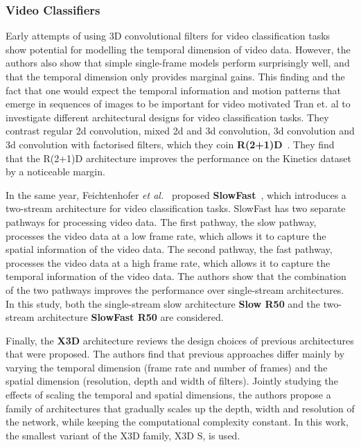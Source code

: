 \documentclass[a4paper]{article}
\begin{document}
\subsubsection{Video Classifiers} %

Early attempts of using 3D convolutional filters for video classification
tasks~\cite{i3d, c3d} show potential for modelling the temporal dimension of
video data. However, the authors also show that simple single-frame models
perform surprisingly well, and that the temporal dimension only provides
marginal gains. This finding and the fact that one would expect the temporal
information and motion patterns that emerge in sequences of images to be
important for video motivated Tran et. al to investigate different architectural
designs for video classification tasks. They contrast regular 2d convolution,
mixed 2d and 3d convolution, 3d convolution and 3d convolution with factorised
filters, which they coin \textbf{R(2+1)D}~\cite{r2plus1d}. They find that the
R(2+1)D architecture improves the performance on the Kinetics dataset by a
noticeable margin. 

In the same year, Feichtenhofer \textit{et al.}~\cite{slowfast} proposed
\textbf{SlowFast}~\cite{slowfast}, which introduces a two-stream architecture
for video classification tasks. SlowFast has two separate pathways for
processing video data. The first pathway, the slow pathway, processes the video
data at a low frame rate, which allows it to capture the spatial information of
the video data. The second pathway, the fast pathway, processes the video data
at a high frame rate, which allows it to capture the temporal information of the
video data. The authors show that the combination of the two pathways improves
the performance over single-stream architectures. In this study, both the
single-stream slow architecture \textbf{Slow R50} and the two-stream
architecture \textbf{SlowFast R50} are considered.

Finally, the \textbf{X3D} architecture reviews the design choices of previous
architectures that were proposed. The authors find that previous approaches
differ mainly by varying the temporal dimension (frame rate and number of
frames) and the spatial dimension (resolution, depth and width of filters).
Jointly studying the effects of scaling the temporal and spatial dimensions, the
authors propose a family of architectures that gradually scales up the depth,
width and resolution of the network, while keeping the computational complexity
constant. In this work, the smallest variant of the X3D family, X3D S,
is used.
\end{document}
